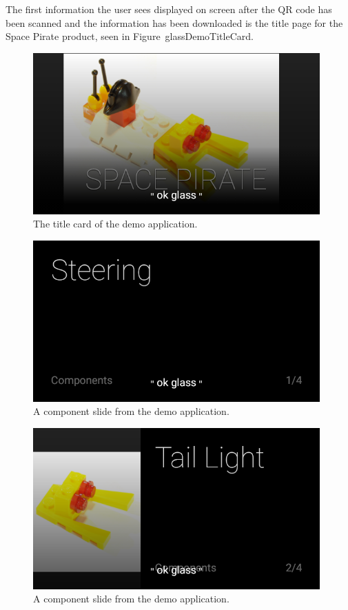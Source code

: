 The first information the user sees displayed on screen after the QR code has been scanned and the information has been downloaded is the title page for the Space Pirate product, seen in Figure~{glassDemoTitleCard}.

	\begin{figure}[H]%
		\centering
		\includegraphics[width=110mm]{images/demo/titleCard}
		\caption{The title card of the demo application.}
		\label{glassDemoTitleCard}
	\end{figure}
	
	\begin{figure}[H]%
		\centering
		\includegraphics[width=110mm]{images/demo/componentText}
		\caption{A component slide from the demo application.}
		\label{glassDemoComponentText}
	\end{figure}

	\begin{figure}[H]%
		\centering
		\includegraphics[width=110mm]{images/demo/columnImage}
		\caption{A component slide from the demo application.}
		\label{glassDemoComponentColumn}
	\end{figure}
	
